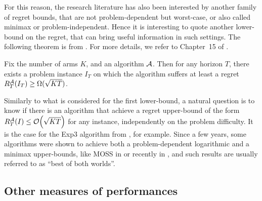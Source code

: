 For this reason, the research literature has also been interested by another family of regret bounds, that are not problem-dependent but worst-case, or also called minimax \cite{Audibert2009minimax,audibert2010minimax} or problem-independent.
Hence it is interesting to quote another lower-bound on the regret, that can bring useful information in such settings.
The following theorem is from \cite{Auer02NonStochastic}.
%
For more details, we refer to Chapter~15 of \cite{LattimoreBanditAlgorithmsBook}.

\begin{theorem}\label{thm:2:worstCaseLowerBound}
\begin{leftbar}[theorembar]  %
    Fix the number of arms $K$, and an algorithm $\mathcal{A}$.
    Then for any horizon $T$, there exists a problem instance $I_T$ on which the algorithm suffers at least a regret $R_T^{\mathcal{A}}(I_T) \geq \Omega(\sqrt{K T})$.
\end{leftbar}  %
\end{theorem}

Similarly to what is considered for the first lower-bound,
a natural question is to know if there is an algorithm that achieve a regret upper-bound of the form $R_T^{\mathcal{A}}(I) \leq \mathop{}\mathopen{}\mathcal{O}\mathopen{}\left(\sqrt{K T}\right)$ for any instance, independently on the problem difficulty.
It is the case for the Exp3 algorithm from \cite{Auer02}, for example.
Since a few years, some algorithms were shown to achieve both a problem-dependent logarithmic and a minimax upper-bounds,
like MOSS in \cite{Audibert2009minimax} or recently \KLUCBpp{} in \cite{Menard17},
and such results are usually referred to as ``best of both worlds''.





\subsection{Other measures of performances}


